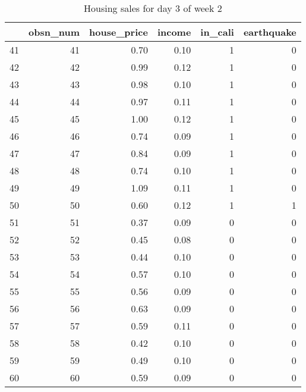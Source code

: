 \begin{table}[ht]
\centering
\begin{tabular}{rrrrrr}
  \hline
 & obsn\_num & house\_price & income & in\_cali & earthquake \\ 
  \hline
41 &  41 & 0.70 & 0.10 &   1 &   0 \\ 
  42 &  42 & 0.99 & 0.12 &   1 &   0 \\ 
  43 &  43 & 0.98 & 0.10 &   1 &   0 \\ 
  44 &  44 & 0.97 & 0.11 &   1 &   0 \\ 
  45 &  45 & 1.00 & 0.12 &   1 &   0 \\ 
  46 &  46 & 0.74 & 0.09 &   1 &   0 \\ 
  47 &  47 & 0.84 & 0.09 &   1 &   0 \\ 
  48 &  48 & 0.74 & 0.10 &   1 &   0 \\ 
  49 &  49 & 1.09 & 0.11 &   1 &   0 \\ 
  50 &  50 & 0.60 & 0.12 &   1 &   1 \\ 
  51 &  51 & 0.37 & 0.09 &   0 &   0 \\ 
  52 &  52 & 0.45 & 0.08 &   0 &   0 \\ 
  53 &  53 & 0.44 & 0.10 &   0 &   0 \\ 
  54 &  54 & 0.57 & 0.10 &   0 &   0 \\ 
  55 &  55 & 0.56 & 0.09 &   0 &   0 \\ 
  56 &  56 & 0.63 & 0.09 &   0 &   0 \\ 
  57 &  57 & 0.59 & 0.11 &   0 &   0 \\ 
  58 &  58 & 0.42 & 0.10 &   0 &   0 \\ 
  59 &  59 & 0.49 & 0.10 &   0 &   0 \\ 
  60 &  60 & 0.59 & 0.09 &   0 &   0 \\ 
   \hline
\end{tabular}
\caption{Housing sales for day 3 of week 2} 
\end{table}
